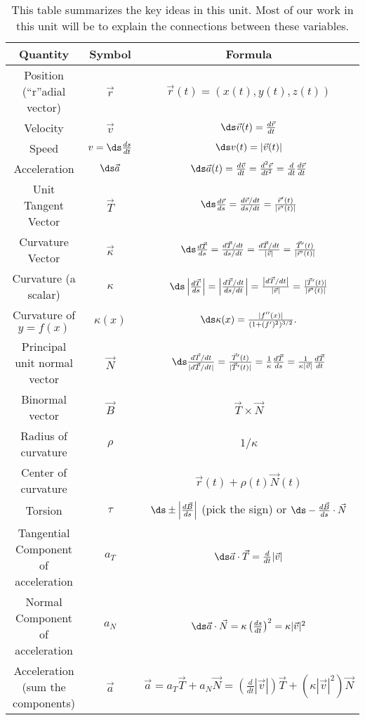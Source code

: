\vspace*{-1cm}
\begin{table}[h]
\begin{tabular}{|c|c|c|}
\hline
Quantity & Symbol & Formula\\\hline\hline
Position (``r''adial vector) & $\vec r$ & $\vec r(t) = (x(t),y(t),z(t))$\\\hline
Velocity  & $\vec v$ & $\ds \vec v(t) = \frac{d\vec r}{dt}$\\\hline
Speed  & $v = \ds\frac{ds}{dt}$ & $\ds v(t) = |\vec v(t)|$\\\hline
Acceleration  & $\ds \vec a$ & $\ds \vec a(t) = \frac{d \vec v}{dt}= \frac{d^2\vec r}{dt^2}= \frac{d}{dt}\frac{d\vec r}{dt}$\\\hline
Unit Tangent Vector & $\vec T$ & $\ds\frac{d\vec r}{ds} = \frac{d\vec r/dt}{ds/dt} = \frac{\vec r^\prime(t)}{|\vec r^\prime(t)|}$\\\hline
Curvature Vector & $\vec \kappa $& $\ds\frac{d\vec T}{ds} =\frac{d\vec T/dt}{ds/dt} = \frac{d\vec T/dt}{|\vec v|} = \frac{\vec T^\prime(t)}{|\vec r^\prime(t)|} $\\\hline
Curvature (a scalar)& $ \kappa $&$\ds \left|\frac{d\vec T}{ds}\right| =\left|\frac{d\vec T/dt}{ds/dt}\right| = \frac{\left|d\vec T/dt\right|}{|\vec v|}= \frac{|\vec T^\prime(t)|}{|\vec r^\prime(t)|}  $ \\\hline
Curvature of $y=f(x)$& $ \kappa(x) $&$\ds \kappa(x) = \frac{|f''(x)|}{(1+(f')^2)^{3/2}}.  $ \\\hline
Principal unit normal vector & $ \vec N$& $\ds \frac{d\vec T/dt}{|d\vec T/dt|} =  \frac{\vec T^\prime(t)}{|\vec T^\prime(t)|}=\frac{1}{\kappa}\frac{d\vec T}{ds} = \frac{1}{\kappa |\vec v|}\frac{d\vec T}{dt}$\\\hline
Binormal vector & $ \vec B$& $ \vec T\times\vec N$\\\hline
Radius of curvature & $ \rho$ & $1/\kappa$\\\hline
Center of curvature &  & $\vec r(t)+\rho(t)\vec N(t)$ \\\hline
Torsion & $ \tau $ & $\ds \pm\left|\frac{d\vec B}{ds}\right|$ (pick the sign) or $\ds-\frac{d\vec B}{ds}\cdot \vec N $\\\hline
Tangential Component of acceleration & $ a_T$ & $\ds \vec a \cdot \vec T = \frac{d}{dt}|\vec v|$\\\hline
Normal Component of acceleration & $ a_N$ & $\ds \vec a \cdot \vec N = \kappa \left(\frac{ds}{dt}\right)^2 = \kappa |\vec v|^2$\\\hline
Acceleration (sum the components)& $ \vec a$ & 
$\vec a 
= a_T\vec T+a_N\vec N 
= \left(\frac{d}{dt}|\vec v|\right) \vec T 
 +\left(\kappa |\vec v|^2\right) \vec N  $\\\hline


\end{tabular}
\caption{This table summarizes the key ideas in this unit. Most of our work in this unit will be to explain the connections between these variables.\label{motion table}} 
\end{table}
\normalsize


